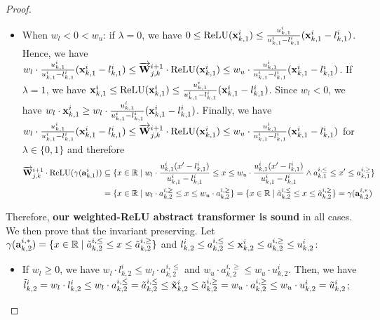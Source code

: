 \begin{proof}
\begin{itemize}
\begin{itemize}
            \item When $w_l < 0 < w_u$: if $\lambda=0$, we have $0\le \text{ReLU}({\mathbf{x}}^i_{k,1})\le \frac{u^i_{k,1}}{u^i_{k,1}-l^i_{k,1}}({\mathbf{x}}^i_{k,1}-l^i_{k,1})$. Hence, we have $ w_l \cdot \frac{u^i_{k,1}}{u^i_{k,1}-l^i_{k,1}}({\mathbf{x}}^i_{k,1}-l^i_{k,1}) \le \overrightarrow{{\mathbf{W}}}^{i+1}_{j,k}\cdot \text{ReLU}({\mathbf{x}}^i_{k,1})\le w_u \cdot \frac{u^i_{k,1}}{u^i_{k,1}-l^i_{k,1}}({\mathbf{x}}^i_{k,1}-l^i_{k,1})$. If $\lambda=1$, we have ${\mathbf{x}}^i_{k,1} \le \text{ReLU}({\mathbf{x}}^i_{k,1})\le \frac{u^i_{k,1}}{u^i_{k,1}-l^i_{k,1}}({\mathbf{x}}^i_{k,1}-l^i_{k,1})$. Since $w_l<0$, we have $w_l\cdot {\mathbf{x}}^i_{k,1} \ge w_l\cdot \frac{u^i_{k,1}}{u^i_{k,1}-l^i_{k,1}}({\mathbf{x}}^i_{k,1}-l^i_{k,1})$.
            Finally, we have $ w_l \cdot \frac{u^i_{k,1}}{u^i_{k,1}-l^i_{k,1}}({\mathbf{x}}^i_{k,1}-l^i_{k,1}) \le \overrightarrow{{\mathbf{W}}}^{i+1}_{j,k}\cdot \text{ReLU}({\mathbf{x}}^i_{k,1})\le w_u \cdot \frac{u^i_{k,1}}{u^i_{k,1}-l^i_{k,1}}({\mathbf{x}}^i_{k,1}-l^i_{k,1})$ for $\lambda\in\{0,1\}$ and therefore             
            \begin{displaymath}
            \begin{aligned}
                \overrightarrow{{\mathbf{W}}}^{i+1}_{j,k}\cdot \text{ReLU}(\gamma({\mathbf{a}}^i_{k,1})) & \subseteq \{ x\in\mathbb{R} \mid w_l \cdot \frac{u^i_{k,1}(x'-l^i_{k,1})}{u^i_{k,1}-l^i_{k,1}} \le x \le  w_u \cdot \frac{u^i_{k,1}(x'-l^i_{k,1})}{u^i_{k,1}-l^i_{k,1}} \wedge a^{i,\le}_{k,1} \le x'\le a^{i,\ge}_{k,1}\} \\
                & = \{ x\in\mathbb{R} \mid w_l \cdot a^{i,\ge}_{k,2} \le x \le w_u\cdot a^{i,\ge}_{k,2}\} = \{x\in\mathbb{R} \mid \tilde{a}^{i,\le}_{k,2} \le x \le \tilde{a}^{i,\ge}_{k,2}\} = \gamma({\mathbf{a}}^{i,*}_{k,2})
            \end{aligned}
            \end{displaymath}
        \end{itemize}
    \end{itemize}
    
    Therefore, \textbf{our weighted-ReLU abstract transformer is sound} in all cases. We then prove that the invariant preserving. Let $\gamma ({\mathbf{a}}^{i,*}_{k,2})=\{x\in\mathbb{R}\mid \tilde{a}^{i,\le}_{k,2} \le x \le \tilde{a}^{i,\ge}_{k,2}\}$ and $l^i_{k,2}\le a^{i,\le}_{k,2} \le {\mathbf{x}}^i_{k,2} \le a^{i,\ge}_{k,2} \le u^i_{k,2}$:
    \begin{itemize}
        \item If $w_l\ge 0$, we have $ w_l \cdot l^i_{k,2} \le w_l \cdot a^{i,\le}_{k,2}$ and $ w_u \cdot a^{i,\ge}_{k,2} \le w_u \cdot u^i_{k,2}$. Then, we have $\tilde{l}^i_{k,2} = w_l \cdot l^i_{k,2} \le w_l \cdot a^{i,\le}_{k,2} = \tilde{a}^{i,\le}_{k,2} \le \tilde{{\mathbf{x}}}^i_{k,2} \le \tilde{a}^{i,\ge}_{k,2} = w_u \cdot a^{i,\ge}_{k,2} \le w_u\cdot u^i_{k,2} = \tilde{u}^i_{k,2}$;


\end{itemize}
\end{proof}
